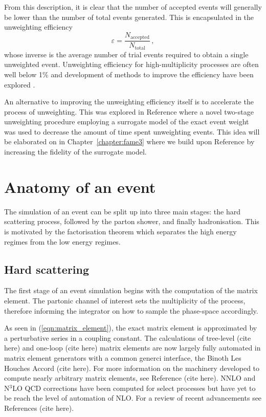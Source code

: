 \documentclass[main.tex]{subfiles}
\begin{document}
    From this description, it is clear that the number
    of accepted events will generally be lower than
    the number of total events generated. This is encapsulated
    in the unweighting efficiency
    \begin{equation}\label{eqn:unweighting_efficiency}
        \varepsilon = \dfrac{N_{\mathrm{accepted}}}{N_{\mathrm{total}}} \, ,
    \end{equation}
    whose inverse is the average number of trial
    events required to obtain a single unweighted event.
    Unweighting efficiency for high-multiplicity processes
    are often well below 1\% \cite{Hoche:2019flt,Gao:2020zvv} and development
    of methods to improve the efficiency have been
    explored \cite{Jadach:1999sf,Jadach:2002kn}.

    An alternative to improving the unweighting efficiency
    itself is to accelerate the process of unweighting. This
    was explored in Reference \cite{Danziger:2021eeg} where a
    novel two-stage unweighting procedure employing a surrogate
    model of the exact event weight was used to decrease the amount of
    time spent unweighting events. This idea will be elaborated on
    in Chapter~\ref{chapter:fame3} where we build upon
    Reference \cite{Danziger:2021eeg} by increasing the fidelity of
    the surrogate model.

    \section{Anatomy of an event}\label{sec:anatomy_event}
    The simulation of an event can be split up into three
    main stages: the hard scattering process, followed by
    the parton shower, and finally hadronisation.
    This is motivated by the factorisation theorem
    which separates the high energy regimes from the low
    energy regimes.
    \subsection*{Hard scattering}\label{sec:me_generators}
    The first stage of an event simulation begins with
    the computation of the matrix element. The partonic
    channel of interest sets the multiplicity of the process,
    therefore informing the integrator on how to sample the phase-space
    accordingly.

    As seen in (\ref{eqn:matrix_element}),
    the exact matrix element is approximated by a perturbative
    series in a coupling constant. The calculations of
    tree-level (cite here) and one-loop (cite here)
    matrix elements are now largely fully automated
    in matrix element generators with a common generci
    interface, the Binoth Les Houches Accord (cite here).
    For more information on the machinery developed to
    compute nearly arbitrary matrix elements, see Reference (cite here).
    NNLO and N$^{3}$LO QCD corrections have been computed
    for select processes but have yet to be reach the
    level of automation of NLO.
    For a review of recent advancements see References (cite here).
    
\end{document}
